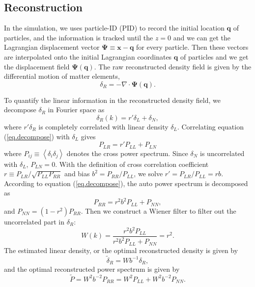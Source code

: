 \documentclass[aps,prd,twocolumn,superscriptaddress,amsfont,amssymb,amsmath,nofootinbib,showpacs,balancelastpage]{revtex4-1}
\newcommand{\bs}{\boldsymbol}
\newcommand{\lb}{\left\langle}
\newcommand{\rb}{\right\rangle}
\begin{document}
\subsection{Reconstruction}
In the simulation, we uses particle-ID (PID) to record the initial location ${\bs q}$ of particles, and the information is tracked until the $z=0$ and we can get the Lagrangian displacement vector ${\bs \Psi}\equiv{\bs x}-{\bs q}$ for every particle. Then these vectors are interpolated onto the initial Lagrangian coordinates ${\bs q}$ of particles and we get the displacement field ${\bs \Psi}({\bs q})$.
The raw reconstructed density field is given by the differential motion of matter elements,
\begin{equation}
    \delta_R=-\nabla\cdot{\bs \Psi}({\bs q}).
\end{equation}

To quantify the linear information in the reconstructed density field, we decompose $\delta_R$ in Fourier space as
\begin{equation}\label{eq.decompose}
    \delta_R(k)=r'\delta_L+\delta_N,
\end{equation}
where $r'\delta_R$ is completely correlated with linear density $\delta_L$. Correlating equation (\ref{eq.decompose}) with $\delta_L$ gives
\begin{equation}
    P_{LR}=r'P_{LL}+P_{LN}
\end{equation}
where $P_{ij}\equiv\lb\delta_i\delta_j\rb$ denotes the cross power spectrum. Since $\delta_N$ is uncorrelated with $\delta_L$, $P_{LN}=0$. With the definition of cross correlation coefficient $r\equiv P_{LR}/\sqrt{P_{LL}P_{RR}}$ and bias $b^2=P_{RR}/P_{LL}$, we solve $r'=P_{LR}/P_{LL}=rb$. According to equation (\ref{eq.decompose}), the auto power spectrum is decomposed as
\begin{equation}
    P_{RR}=r^2b^2P_{LL}+P_{NN},
\end{equation}
and $P_{NN}=(1-r^2)P_{RR}$. Then we construct a Wiener filter to filter out the uncorrelated part in $\delta_R$:
\begin{equation}
    W(k)=\frac{r^2b^2P_{LL}}{r^2b^2P_{LL}+P_{NN}}=r^2.
\end{equation}
The estimated linear density, or the optimal reconstructed density is given by
\begin{equation}
    \tilde\delta_R=Wb^{-1}\delta_R,
\end{equation}
and the optimal reconstructed power spectrum is given by
\begin{equation}
    \tilde P=W^2b^{-2}P_{RR}=W^2P_{LL}+W^2b^{-2}P_{NN}.
\end{equation}
\end{document}

